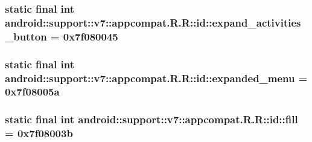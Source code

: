 \hypertarget{classandroid_1_1support_1_1v7_1_1appcompat_1_1_r_1_1id_deccb06ce9919a8f5914082512abb9d9}{
\subsubsection[{expand\_\-activities\_\-button}]{\setlength{\rightskip}{0pt plus 5cm}static final int android::support::v7::appcompat.R.R::id::expand\_\-activities\_\-button = 0x7f080045}}
\label{classandroid_1_1support_1_1v7_1_1appcompat_1_1_r_1_1id_deccb06ce9919a8f5914082512abb9d9}


\hypertarget{classandroid_1_1support_1_1v7_1_1appcompat_1_1_r_1_1id_5c08771675acd77e365bfe388198355f}{
\subsubsection[{expanded\_\-menu}]{\setlength{\rightskip}{0pt plus 5cm}static final int android::support::v7::appcompat.R.R::id::expanded\_\-menu = 0x7f08005a}}
\label{classandroid_1_1support_1_1v7_1_1appcompat_1_1_r_1_1id_5c08771675acd77e365bfe388198355f}


\hypertarget{classandroid_1_1support_1_1v7_1_1appcompat_1_1_r_1_1id_8a763ba0cfe1ec7e7a46ec1787343303}{
\subsubsection[{fill}]{\setlength{\rightskip}{0pt plus 5cm}static final int android::support::v7::appcompat.R.R::id::fill = 0x7f08003b}}
\label{classandroid_1_1support_1_1v7_1_1appcompat_1_1_r_1_1id_8a763ba0cfe1ec7e7a46ec1787343303}


